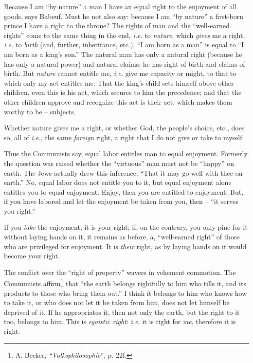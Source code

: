 \documentclass[12pt,a4paper]{book}
\begin{document}
Because I am ``by nature'' a man I have an equal right to the enjoyment of 
all goods, says Babeuf. Must he not also say: because I am ``by nature'' a 
first-born prince I have a right to the throne? The rights of man and the 
``well-earned rights'' come to the same thing in the end, \textit{i.e.} to 
\textit{nature}, which \textit{gives} me a right, \textit{i.e.} to 
\textit{birth} (and, further, inheritance, etc.). ``I am born as a man'' is 
equal to ``I am born as a king's son.'' The natural man has only a natural 
right (because he has only a natural power) and natural claims: he has right 
of birth and claims of birth. But \textit{nature} cannot entitle me, 
\textit{i.e.} give me capacity or might, to that to which only my act entitles 
me. That the king's child sets himself above other children, even this is his 
act, which secures to him the precedence; and that the other children approve 
and recognize this act is their act, which makes them worthy to be -- 
subjects.

Whether nature gives me a right, or whether God, the people's choice, etc., 
does so, all of \textit{i.e.}, the same \textit{foreign} right, a right that 
I do not give or take to myself.

Thus the Communists say, equal labor entitles man to equal enjoyment. Formerly 
the question was raised whether the ``virtuous'' man must not be ``happy'' 
on earth. The Jews actually drew this inference: ``That it may go well with 
thee on earth.'' No, equal labor does not entitle you to it, but equal 
enjoyment alone entitles you to equal enjoyment. Enjoy, then you are entitled 
to enjoyment. But, if you have labored and let the enjoyment be taken from 
you, then -- ``it serves you right.''

If you \textit{take} the enjoyment, it is your right; if, on the contrary, you 
only pine for it without laying hands on it, it remains as before, a, 
``well-earned right'' of those who are privileged for enjoyment. It is 
\textit{their} right, as by laying hands on it would become your right.

The conflict over the ``right of property'' wavers in vehement commotion. 
The Communists affirm\footnote{A. Becker, \textit{``Volksphilosophie}'', p. 
22f.} that ``the earth belongs rightfully to him who tills it, and its 
products to those who bring them out.'' I think it belongs to him who knows 
how to take it, or who does not let it be taken from him, does not let himself 
be deprived of it. If he appropriates it, then not only the earth, but the 
right to it too, belongs to him. This is \textit{egoistic right}: 
\textit{i.e.} it is right for \textit{me}, therefore it is right.
\end{document}
